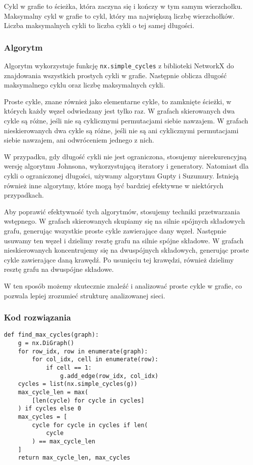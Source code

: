 \documentclass[a4paper, 12pt]{article}
\begin{document}
Cykl w grafie to ścieżka, która zaczyna się i kończy w tym samym wierzchołku. Maksymalny cykl w grafie to cykl, który ma największą liczbę wierzchołków. Liczba maksymalnych cykli to liczba cykli o tej samej długości. \cite{cykle}

\subsubsection*{Algorytm}

Algorytm wykorzystuje funkcję \texttt{nx.simple\_cycles} z biblioteki NetworkX do znajdowania wszystkich prostych cykli w grafie. Następnie oblicza długość maksymalnego cyklu oraz liczbę maksymalnych cykli.

Proste cykle, znane również jako elementarne cykle, to zamknięte ścieżki, w których każdy węzeł odwiedzany jest tylko raz. W grafach skierowanych dwa cykle są różne, jeśli nie są cyklicznymi permutacjami siebie nawzajem. W grafach nieskierowanych dwa cykle są różne, jeśli nie są ani cyklicznymi permutacjami siebie nawzajem, ani odwróceniem jednego z nich.

W przypadku, gdy długość cykli nie jest ograniczona, stosujemy nierekurencyjną wersję algorytmu Johnsona, wykorzystującą iteratory i generatory. Natomiast dla cykli o ograniczonej długości, używamy algorytmu Gupty i Suzumury. Istnieją również inne algorytmy, które mogą być bardziej efektywne w niektórych przypadkach.

Aby poprawić efektywność tych algorytmów, stosujemy techniki przetwarzania wstępnego. W grafach skierowanych skupiamy się na silnie spójnych składowych grafu, generując wszystkie proste cykle zawierające dany węzeł. Następnie usuwamy ten węzeł i dzielimy resztę grafu na silnie spójne składowe. W grafach nieskierowanych koncentrujemy się na dwuspójnych składowych, generując proste cykle zawierające daną krawędź. Po usunięciu tej krawędzi, również dzielimy resztę grafu na dwuspójne składowe.

W ten sposób możemy skutecznie znaleźć i analizować proste cykle w grafie, co pozwala lepiej zrozumieć strukturę analizowanej sieci.\cite{s_cycles}

\subsubsection*{Kod rozwiązania}
\begin{verbatim}
def find_max_cycles(graph):
    g = nx.DiGraph()
    for row_idx, row in enumerate(graph):
        for col_idx, cell in enumerate(row):
            if cell == 1:
                g.add_edge(row_idx, col_idx)
    cycles = list(nx.simple_cycles(g))
    max_cycle_len = max(
        [len(cycle) for cycle in cycles]
    ) if cycles else 0
    max_cycles = [
        cycle for cycle in cycles if len(
            cycle
        ) == max_cycle_len
    ]
    return max_cycle_len, max_cycles
\end{verbatim}
\end{document}

